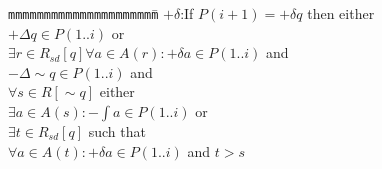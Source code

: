 
\begin{tabbing}
{\tt mmm}\={\tt mmmmmm}\={\tt mmmm}\={\tt mmmm}\={\tt mmmm}\=\kill
\>$+\delta$:\>If $P(i + 1) = + \delta q$ then either \\
\>\>$+\Delta q \in P(1..i)$ or \\
\>\>\>$\exists r \in R_{sd}[q] \forall a \in A(r): +\delta a \in P(1..i)$ and \\
\>\>\>$- \Delta \sim q \in P(1..i)$ and \\
\>\>\>$\forall s \in R[\sim q]$ either \\
\>\>\>\>$\exists a\in A(s): -\int a\in P(1..i)$ or \\
\>\>\>\>$\exists t\in R_{sd}[q]$ such that \\
\>\>\>\>\> $\forall a\in A(t): +\delta a\in P(1..i)$ and $t>s$ 
\end{tabbing}
